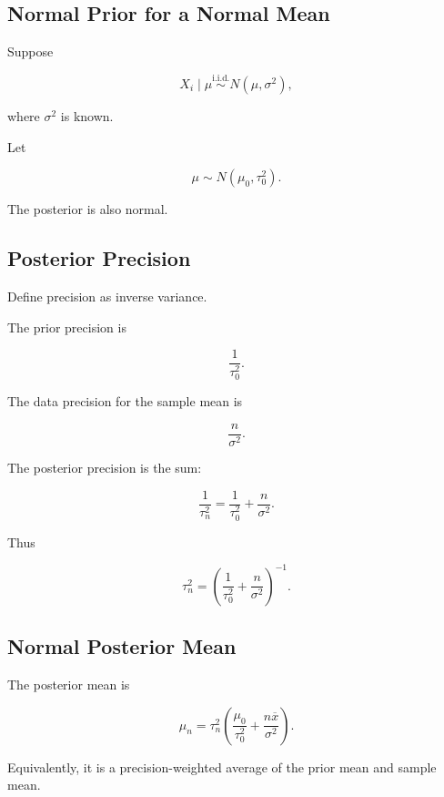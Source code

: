 \subsection{Normal Prior for a Normal Mean}
\label{subsec:normal-normal-model}

Suppose

\[
X_i\mid\mu
\overset{\text{i.i.d.}}{\sim}
N(\mu,\sigma^2),
\]

where \(\sigma^2\) is known.

Let

\[
\boxed{
\mu
\sim
N(\mu_0,\tau_0^2).
}
\]

The posterior is also normal.

\subsection{Posterior Precision}
\label{subsec:posterior-precision-normal}

Define precision as inverse variance.

The prior precision is

\[
\boxed{
\frac1{\tau_0^2}.
}
\]

The data precision for the sample mean is

\[
\boxed{
\frac{n}{\sigma^2}.
}
\]

The posterior precision is the sum:

\[
\boxed{
\frac1{\tau_n^2}
=
\frac1{\tau_0^2}
+
\frac{n}{\sigma^2}.
}
\]

Thus

\[
\boxed{
\tau_n^2
=
\left(
\frac1{\tau_0^2}
+
\frac{n}{\sigma^2}
\right)^{-1}.
}
\]

\subsection{Normal Posterior Mean}
\label{subsec:normal-posterior-mean}

The posterior mean is

\[
\boxed{
\mu_n
=
\tau_n^2
\left(
\frac{\mu_0}{\tau_0^2}
+
\frac{
n\overline{x}
}{
\sigma^2
}
\right).
}
\]

Equivalently, it is a precision-weighted average of the prior mean and
sample mean.

